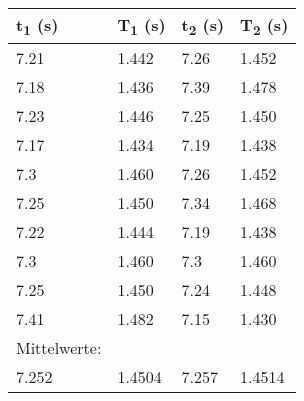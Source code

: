 \documentclass[titlepage=firstcover, captions=tableheading]{scrartcl}
\begin{document}
\begin{minipage}{\linewidth}
    \centering
    \begin{tabular}{llll}
        \toprule
        t\textsubscript{1} (s) & T\textsubscript{1} (s) & t\textsubscript{2} (s) & T\textsubscript{2} (s) \\
        \midrule
        7.21 & 1.442 & 7.26 & 1.452\\
        7.18 & 1.436 & 7.39 & 1.478\\
        7.23 & 1.446 & 7.25 & 1.450\\
        7.17 & 1.434 & 7.19 & 1.438\\
        7.3  & 1.460 & 7.26 & 1.452\\
        7.25 & 1.450 & 7.34 & 1.468\\
        7.22 & 1.444 & 7.19 & 1.438\\
        7.3  & 1.460 & 7.3  & 1.460\\
        7.25 & 1.450 & 7.24 & 1.448\\
        7.41 & 1.482 & 7.15 & 1.430\\
        \midrule
        Mittelwerte:\\
        7.252 & 1.4504 & 7.257 & 1.4514  \\
        \bottomrule
        
    \end{tabular}
    \label{tab:2}
\end{minipage}
\leavevmode
\newline
\vspace*{1 cm}
\newline
\end{document}
